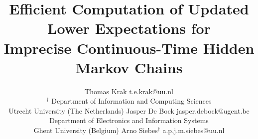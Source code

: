 \documentclass[twoside,11pt]{article}
\begin{document}


\title{Efficient Computation of Updated Lower Expectations for\\ Imprecise Continuous-Time Hidden Markov Chains}
\author{\name Thomas Krak \email t.e.krak@uu.nl\\
\addr $^\dagger$ Department of Information and Computing Sciences\\
Utrecht University (The Netherlands)
\AND
\name Jasper De Bock \email jasper.debock@ugent.be\\
\addr Department of Electronics and Information Systems\\
Ghent University (Belgium)
\AND
\name Arno Siebes$^\dagger$ \email a.p.j.m.siebes@uu.nl
}
\maketitle

\end{document}
